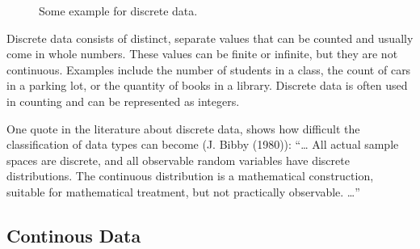 \documentclass[
  a4paper,
]{scrbook}
\begin{document}
\begin{figure}[ht]


\caption{\label{fig-discretedata}Some example for discrete data.}

\end{figure}%

Discrete data consists of distinct, separate values that can be counted
and usually come in whole numbers. These values can be finite or
infinite, but they are not continuous. Examples include the number of
students in a class, the count of cars in a parking lot, or the quantity
of books in a library. Discrete data is often used in counting and can
be represented as integers.

One quote in the literature about discrete data, shows how difficult the
classification of data types can become (J. Bibby (1980)): ``\ldots{}
All actual sample spaces are discrete, and all observable random
variables have discrete distributions. The continuous distribution is a
mathematical construction, suitable for mathematical treatment, but not
practically observable. \ldots{}''

\subsection{Continous Data}\label{continous-data}
\end{document}

